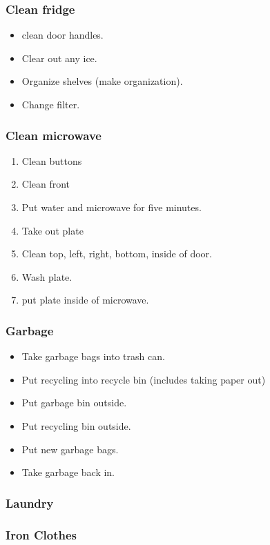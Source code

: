 \begin{frame} 
\frametitle{Clean fridge} 
\begin{itemize} 
\small \item \small clean door handles.
\item \small Clear out any ice. 
\item \small Organize shelves (make organization). 
\item \small Change filter. 
\end{itemize}
\end{frame}

\begin{frame} 
\frametitle{Clean microwave}
\begin{enumerate} 
\small \item \small Clean buttons 
\item \small Clean front
\item \small Put water and microwave for five minutes. 
\item \small Take out plate
\item \small Clean top, left, right, bottom, inside of door.
\item \small Wash plate. 
\item \small put plate inside of microwave. 
\end{enumerate} 
\end{frame}

\begin{frame} 
\frametitle{Garbage} 
\begin{itemize} 
\tiny \item \tiny Take garbage bags into trash can.  
\item \tiny Put recycling into recycle bin (includes taking paper out)
\item \tiny Put garbage bin outside. 
\item \tiny Put recycling bin outside.  
\item \tiny Put new garbage bags.  
\item \tiny Take garbage back in.  
\end{itemize} 
\end{frame} 

\begin{frame}
\frametitle{Laundry} 
\end{frame}   

\begin{frame} 
\frametitle{Iron Clothes} 
\end{frame}

